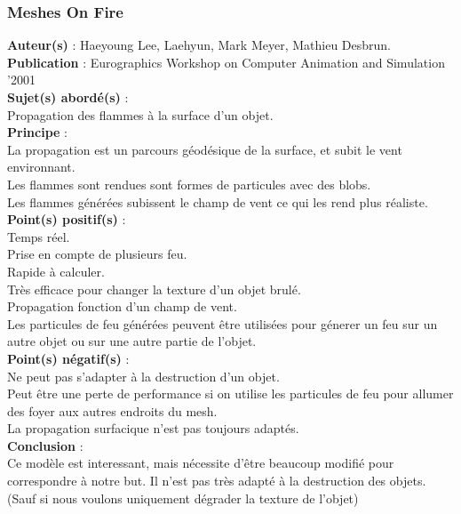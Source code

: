 \documentclass[a4paper,10pt]{article}
\begin{document}
\subsubsection{Meshes On Fire}
\textbf{Auteur(s)} : Haeyoung Lee, Laehyun, Mark Meyer, Mathieu Desbrun.\\
\textbf{Publication} : Eurographics Workshop on Computer Animation and Simulation '2001 \\
\textbf{Sujet(s) abordé(s)} : \\
	Propagation des flammes à la surface d'un objet.\\
\textbf{Principe} : \\
	La propagation est un parcours géodésique de la surface, et subit le vent environnant.\\	
	Les flammes sont rendues sont formes de particules avec des blobs.\\
	Les flammes générées subissent le champ de vent ce qui les rend plus réaliste.\\
\textbf{Point(s) positif(s)} :\\
	Temps réel.\\
	Prise en compte de plusieurs feu.\\
	Rapide à calculer.\\
	Très efficace pour changer la texture d'un objet brulé.\\
	Propagation fonction d'un champ de vent.\\
	Les particules de feu générées peuvent être utilisées pour génerer un feu sur un autre objet ou sur une autre partie de l'objet.\\
\textbf{Point(s) négatif(s)} :\\
	Ne peut pas s'adapter à la destruction d'un objet.\\
	Peut être une perte de performance si on utilise les particules de feu pour allumer des foyer aux autres endroits du mesh.\\
	La propagation surfacique n'est pas toujours adaptés.\\	
\textbf{Conclusion} :\\
	Ce modèle est interessant, mais nécessite d'être beaucoup modifié pour correspondre à notre but. Il n'est pas très adapté à la destruction des objets. (Sauf si nous voulons uniquement dégrader la texture de l'objet) \\
\end{document}

